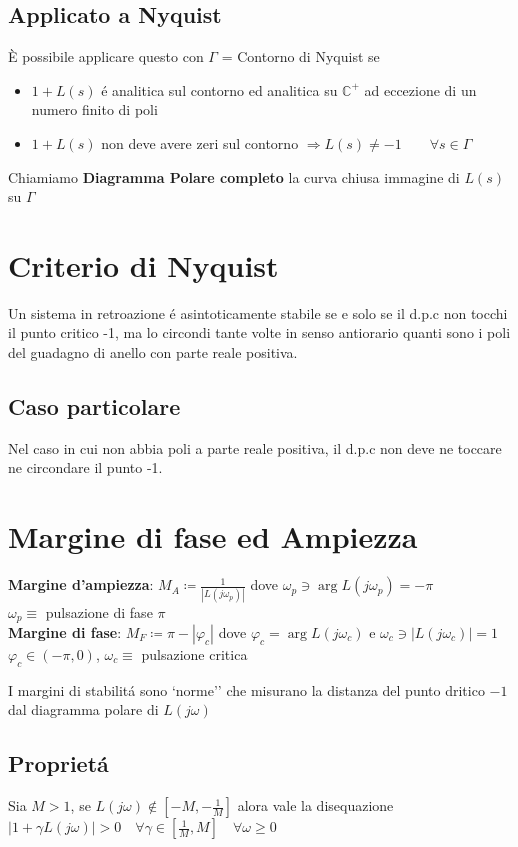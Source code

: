 \documentclass{article}
\begin{document}
\subsection{Applicato a Nyquist}
\`E possibile applicare questo con $\Gamma$ = Contorno di Nyquist se
\begin{itemize}
    \item $1+L(s)$ \'e analitica sul contorno ed analitica su $\mathbb{C}^+$ ad eccezione di un numero finito di poli
    \item $1+L(s)$ non deve avere zeri sul contorno $\Rightarrow L(s) \neq -1 \qquad \forall s \in \Gamma$
\end{itemize}

Chiamiamo \textbf{Diagramma Polare completo} la curva chiusa immagine di $L(s)$ su $\Gamma$

\section{Criterio di Nyquist}
Un sistema in retroazione \'e asintoticamente stabile se e solo se il d.p.c non tocchi il punto critico -1, ma lo circondi tante volte in senso antiorario quanti sono i poli del guadagno di anello con parte reale positiva.

\subsection{Caso particolare}
Nel caso in cui non abbia poli a parte reale positiva, il d.p.c non deve ne toccare ne circondare il punto -1.

\section{Margine di fase ed Ampiezza}
\textbf{Margine d'ampiezza}: ${\displaystyle M_A \coloneqq \frac{1}{|L(j\omega_p)|}}$ dove $\omega_p \ni \arg L(j\omega_p) = -\pi$\\
$\omega_p \equiv$ pulsazione di fase $\pi$\\
\textbf{Margine di fase}:  ${\displaystyle M_F \coloneqq \pi - |\varphi_c|}$ dove $\varphi_c = \arg L(j\omega_c)$ e $\omega_c \ni |L(j\omega_c)| = 1$\\
$\varphi_c \in (-\pi, 0)$, $\omega_c \equiv$ pulsazione critica

I margini di stabilit\'a sono `norme'' che misurano la distanza del punto dritico $-1$ dal diagramma polare di $L(j\omega)$

\subsection{Propriet\'a}
Sia $M>1$, se $L(j\omega) \notin \left[-M,-\frac{1}{M}\right]$ alora vale la disequazione $|1 + \gamma L(j\omega)| > 0 \quad \forall \gamma \in \left[\frac{1}{M}, M\right] \quad \forall \omega \ge 0$
\end{document}
